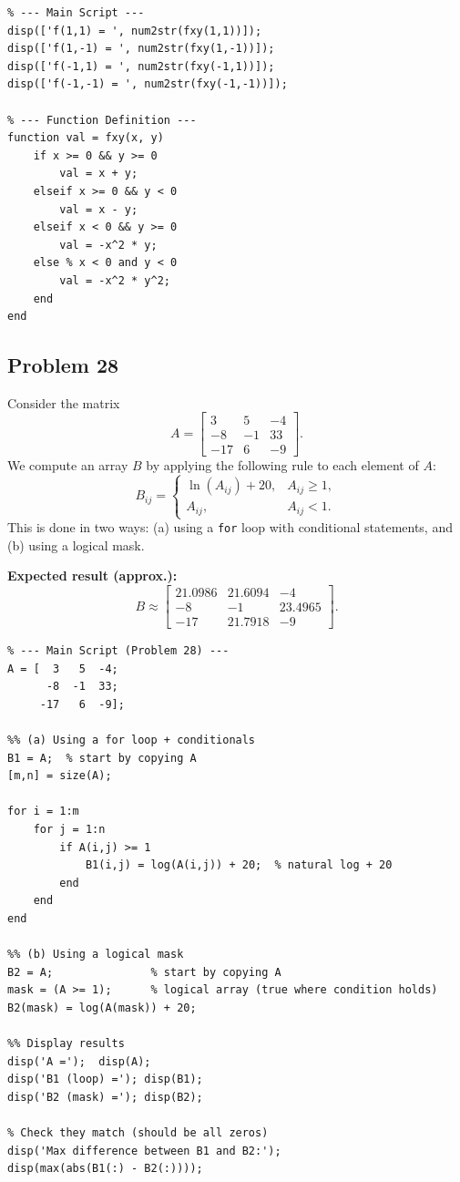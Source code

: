 \documentclass[DIN, pagenumber=false, fontsize=11pt, parskip=half]{scrartcl}
\newcommand{\myproblem}[1]{\subsection*{#1}}
\begin{document}
\begin{lstlisting}
% --- Main Script ---
disp(['f(1,1) = ', num2str(fxy(1,1))]);
disp(['f(1,-1) = ', num2str(fxy(1,-1))]);
disp(['f(-1,1) = ', num2str(fxy(-1,1))]);
disp(['f(-1,-1) = ', num2str(fxy(-1,-1))]);

% --- Function Definition ---
function val = fxy(x, y)
    if x >= 0 && y >= 0
        val = x + y;
    elseif x >= 0 && y < 0
        val = x - y;
    elseif x < 0 && y >= 0
        val = -x^2 * y;
    else % x < 0 and y < 0
        val = -x^2 * y^2;
    end
end
\end{lstlisting}

\myproblem{Problem 28}
Consider the matrix
\[
A=
\begin{bmatrix}
3 & 5 & -4\\
-8 & -1 & 33\\
-17 & 6 & -9
\end{bmatrix}.
\]
We compute an array $B$ by applying the following rule to each element of $A$:
\[
B_{ij}=
\begin{cases}
\ln(A_{ij})+20, & A_{ij}\ge 1,\\
A_{ij}, & A_{ij}<1.
\end{cases}
\]
This is done in two ways: (a) using a \texttt{for} loop with conditional statements, and (b) using a logical mask.

\noindent\textbf{Expected result (approx.):}
\[
B\approx
\begin{bmatrix}
21.0986 & 21.6094 & -4\\
-8 & -1 & 23.4965\\
-17 & 21.7918 & -9
\end{bmatrix}.
\]

\begin{lstlisting}
% --- Main Script (Problem 28) ---
A = [  3   5  -4;
      -8  -1  33;
     -17   6  -9];

%% (a) Using a for loop + conditionals
B1 = A;  % start by copying A
[m,n] = size(A);

for i = 1:m
    for j = 1:n
        if A(i,j) >= 1
            B1(i,j) = log(A(i,j)) + 20;  % natural log + 20
        end
    end
end

%% (b) Using a logical mask
B2 = A;               % start by copying A
mask = (A >= 1);      % logical array (true where condition holds)
B2(mask) = log(A(mask)) + 20;

%% Display results
disp('A =');  disp(A);
disp('B1 (loop) ='); disp(B1);
disp('B2 (mask) ='); disp(B2);

% Check they match (should be all zeros)
disp('Max difference between B1 and B2:');
disp(max(abs(B1(:) - B2(:))));
\end{lstlisting}
\end{document}
